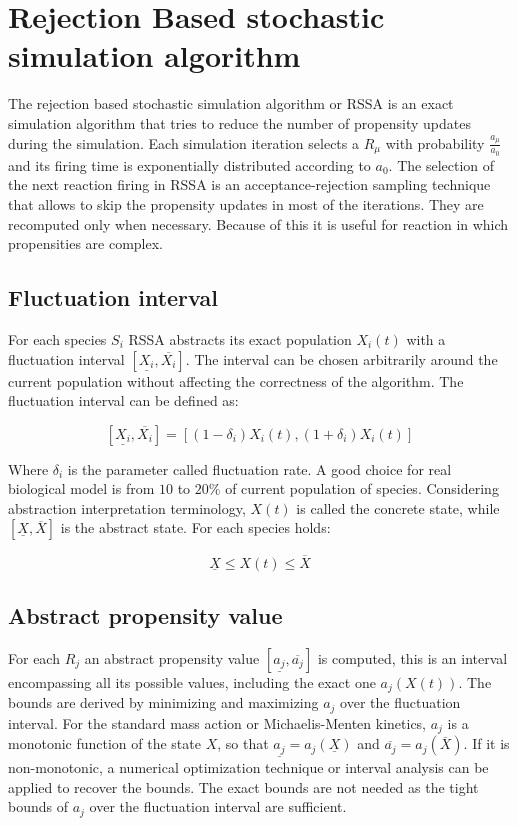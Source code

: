 \section{Rejection Based stochastic simulation algorithm}
The rejection based stochastic simulation algorithm or RSSA is an exact simulation algorithm that tries to reduce the number of propensity updates during the simulation.
Each simulation iteration selects a $R_\mu$ with probability $\frac{a_\mu}{a_0}$ and its firing time is exponentially distributed according to $a_0$.
The selection of the next reaction firing in RSSA is an acceptance-rejection sampling technique that allows to skip the propensity updates in most of the iterations.
They are recomputed only when necessary.
Because of this it is useful for reaction in which propensities are complex.

  \subsection{Fluctuation interval}
  For each species $S_i$ RSSA abstracts its exact population $X_i(t)$ with a fluctuation interval $[\underline{X_i}, \overline{X_i}]$.
  The interval can be chosen arbitrarily around the current population without affecting the correctness of the algorithm.
  The fluctuation interval can be defined as:

  $$[\underline{X_i}, \overline{X_i}] = [(1-\delta_i)X_i(t), (1+\delta_i)X_i(t)]$$

  Where $\delta_i$ is the parameter called fluctuation rate.
  A good choice for real biological model is from $10$ to $20\%$ of current population of species.
  Considering abstraction interpretation terminology, $X(t)$ is called the concrete state, while $[\underline{X},\overline{X}]$ is the abstract state.
  For each species holds:

  $$\underline{X}\le X(t)\le \overline{X}$$

  \subsection{Abstract propensity value}
  For each $R_j$ an abstract propensity value $[\underline{a_j},\overline{a_j}]$ is computed, this is an interval encompassing all its possible values, including the exact one $a_j(X(t))$.
  The bounds are derived by minimizing and maximizing $a_j$ over the fluctuation interval.
  For the standard mass action or Michaelis-Menten kinetics, $a_j$ is a monotonic function of the state $X$, so that $\underline{a_j} = a_j(\underline{X})$ and $\overline{a_j} = a_j(\overline{X})$.
  If it is non-monotonic, a numerical optimization technique or interval analysis can be applied to recover the bounds.
  The exact bounds are not needed as the tight bounds of $a_j$ over the fluctuation interval are sufficient.

